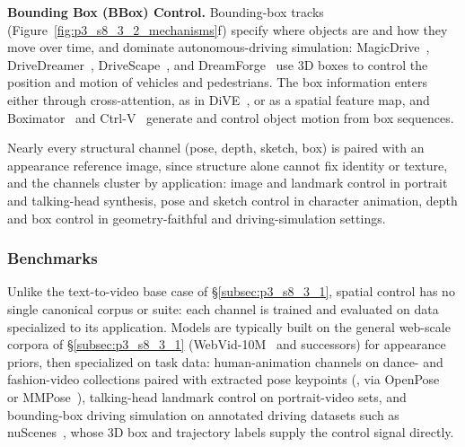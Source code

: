 \noindent\textbf{Bounding Box (BBox) Control.} Bounding-box tracks (Figure~\ref{fig:p3_s8_3_2_mechanisms}f) specify where objects are and how they move over time, and dominate autonomous-driving simulation: MagicDrive~\cite{gao2023magicdrive}, DriveDreamer~\cite{wang2024drivedreamer}, DriveScape~\cite{wu2024drivescape}, and DreamForge~\cite{mei2024dreamforge} use 3D boxes to control the position and motion of vehicles and pedestrians. The box information enters either through cross-attention, as in DiVE~\cite{jiang2024dive}, or as a spatial feature map, and Boximator~\cite{wang2024boximator} and Ctrl-V~\cite{luo2025ctrl} generate and control object motion from box sequences.

Nearly every structural channel (pose, depth, sketch, box) is paired with an appearance reference image, since structure alone cannot fix identity or texture, and the channels cluster by application: image and landmark control in portrait and talking-head synthesis, pose and sketch control in character animation, depth and box control in geometry-faithful and driving-simulation settings.

\subsubsection{Benchmarks}
\label{subsubsec:p3_s8_3_2_benchmarks}
Unlike the text-to-video base case of §\ref{subsec:p3_s8_3_1}, spatial control has no single canonical corpus or suite: each channel is trained and evaluated on data specialized to its application. Models are typically built on the general web-scale corpora of §\ref{subsec:p3_s8_3_1} (WebVid-10M~\cite{bain2021frozen} and successors) for appearance priors, then specialized on task data: human-animation channels on dance- and fashion-video collections paired with extracted pose keypoints (\eg, via OpenPose~\cite{cao2017realtime} or MMPose~\cite{mmpose2020}), talking-head landmark control on portrait-video sets, and bounding-box driving simulation on annotated driving datasets such as nuScenes~\cite{caesar2020nuscenes}, whose 3D box and trajectory labels supply the control signal directly.

